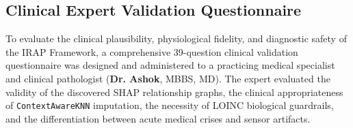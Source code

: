 \documentclass[MTech]{ugthesis}
\begin{document}
\begin{singlespace}
  
\end{singlespace}

\appendix
\begin{appendices}
\chapter{Clinical Expert Validation Questionnaire}
To evaluate the clinical plausibility, physiological fidelity, and diagnostic safety of the \ac{IRAP} Framework, a comprehensive 39-question clinical validation questionnaire was designed and administered to a practicing medical specialist and clinical pathologist (\textbf{Dr. Ashok}, MBBS, MD). The expert evaluated the validity of the discovered \ac{SHAP} relationship graphs, the clinical appropriateness of \texttt{ContextAwareKNN} imputation, the necessity of \ac{LOINC} biological guardrails, and the differentiation between acute medical crises and sensor artifacts.


\end{appendices}
\end{document}
